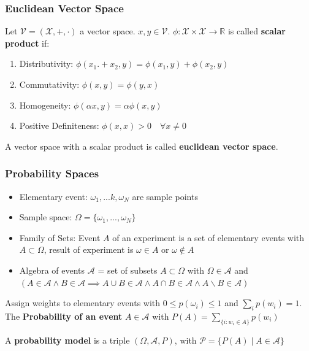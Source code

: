 \subsubsection{Euclidean Vector Space}
Let $\mathcal V = (\mathcal X, +, \cdot)$ a vector space. $x,y \in \mathcal V$. $\phi:\mathcal X \times \mathcal X \to \mathbb R$ is called \textbf{scalar product} if:
\begin{enumerate}
	\item Distributivity: $\phi(x_1. + x_2, y) = \phi(x_1, y) + \phi(x_2, y)$
	\item Commutativity: $\phi(x,y) = \phi(y,x)$
	\item Homogeneity: $\phi(\alpha x, y) = \alpha\phi(x,y)$
	\item Positive Definiteness: $\phi(x,x) > 0 \quad \forall x \neq 0$
\end{enumerate} 
A vector space with a scalar product is called \textbf{euclidean vector space}.

\subsubsection{Probability Spaces}
\begin{itemize}
	\item Elementary event: $\omega_1, ...k, \omega_N$ are sample points
	\item Sample space: $\Omega = \{\omega_1, ..., \omega_N\}$
	\item Family of Sets: Event $A$ of an experiment is a set of elementary events with $A \subset \Omega$, result of experiment is $\omega \in A$ or $\omega \not\in A$
	\item Algebra of events $\mathcal A$ = set of subsets $A\subset \Omega$ with $\Omega \in \mathcal A$ and $(A\in \mathcal A \land B \in \mathcal A \implies A\cup B \in \mathcal A \land A \cap B\in \mathcal A \land A \backslash B \in \mathcal A)$
\end{itemize}
Assign weights to elementary events with $0\leq p(\omega_i) \leq 1$ and $\sum_ip(w_i) = 1$. The \textbf{Probability of an event} $A\in \mathcal A$ with $P(A) = \sum_{\{i:w_i\in A\}} p(w_i)$

A \textbf{probability model} is a triple $(\Omega, \mathcal A, P)$, with $\mathcal P = \{P(A) \mid A \in \mathcal A\}$

\sepline